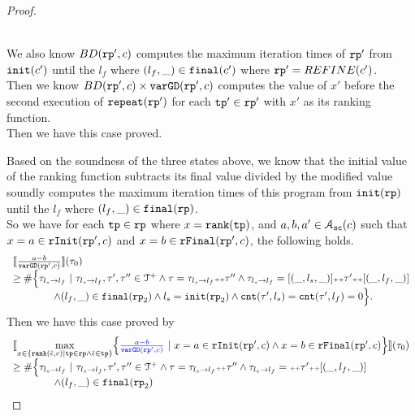\begin{proof}
\begin{itemize}
\\
We also know $BD(\mathtt{rp}', c)$ computes the maximum iteration times of $\mathtt{rp}'$ from $\mathtt{init}(c')$ until the $l_f$ where $(l_f, \_) \in \mathtt{final}(c')$ where $\mathtt{rp}' = REFINE(c')$.
\\
Then we know $BD(\mathtt{rp}', c)  \times
{\ensuremath{\mathtt{varGD}}(\ensuremath{\mathtt{rp}}', c)}$
computes the value of $x'$ before the second execution of $\mathtt{repeat}(\mathtt{rp}')$ for each $\mathtt{tp}' \in \mathtt{rp}'$ with $x'$ as its ranking function.
\\
Then we have this case proved.
\end{itemize}
Based on the soundness of the three states above, we know that the initial value of the ranking function
subtracts its final value divided by the modified value soundly computes the maximum iteration times of this program from $\mathtt{init}(\mathtt{rp})$ until the $l_f$ where $(l_f, \_) \in \mathtt{final}(\mathtt{rp})$.
\\
So we have for each $\mathtt{tp} \in \mathtt{rp}$ where $x = \mathtt{rank}(\mathtt{tp})$,
and $a, b, a ' \in \mathcal{A}_{\mathtt{sc}}(c)$
such that $x = a \in \mathtt{rInit}(\mathtt{rp}', c)$ and $x = b \in \mathtt{rFinal}(\mathtt{rp}', c)$,
the following holds.
\[
  \begin{array}{l}
  \llbracket \frac{a - b}{\mathtt{varGD}(\mathtt{rp}', c)} \rrbracket(\mathtt{\tau}_0) 
  \\ \geq
    \# \Big\{\mathtt{\tau}_{l_s \to l_f} ~\vert~ \mathtt{\tau}_{l_s \to l_f}, \mathtt{\tau}', \mathtt{\tau}''\in \mathcal{T}^{+}
    \land \mathtt{\tau} = \mathtt{\tau}_{l_s \to l_f} {\scriptscriptstyle ++} \mathtt{\tau}''
    \land \mathtt{\tau}_{l_s \to l_f} = [(\_, l_s, \_)] {\scriptscriptstyle ++} \mathtt{\tau}' {\scriptscriptstyle ++} [(\_, l_f, \_)]
    \\ \qquad \qquad
    \land (l_{f}, \_) \in \mathtt{final}(\mathtt{rp}_2)
    \land l_s = \mathtt{init}(\mathtt{rp}_2)
    \land \mathtt{cnt}(\mathtt{\tau}', l_s) = \mathtt{cnt}(\mathtt{\tau}', l_f) = 0 
    \Big\}.
    \end{array}
\]
Then we have this case proved by
\[
  \begin{array}{l}
    \econfig{
      \max\limits_{x \in \left\{ \locbound(\absevent, c) | \tpath \in \rprog \land \absevent \in \tpath \right\}}
      \left\{ \highlight{\frac{a - b}{\varGD(\rprog', c)}} ~\vert~
      x = a \in \rfinit(\rprog', c)
      \land x = b \in \rffinal(\rprog', c)
      \right\} 
    }(\trace_0) \\
    \geq
    \# \Big\{\trace_{l_s \to l_f} ~\vert~ \trace_{l_s \to l_f}, \trace', \trace''\in \ftdom
    \land \trace = \trace_{l_s \to l_f} \tracecat \trace''
    \land \trace_{l_s \to l_f} = \tracecat \trace' \tracecat [(\_, l_f, \_)]
    \\ \qquad \qquad
    \land (l_{f}, \_) \in \absfinal(\rprog_2)

\end{array}\]
\end{proof}
